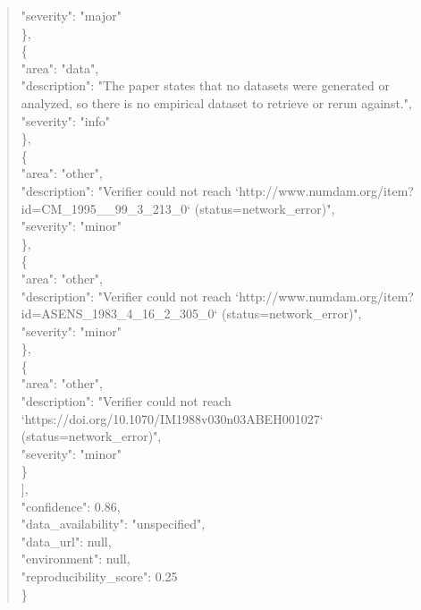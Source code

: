 \documentclass[11pt]{article}
\begin{document}
\begin{quote}
      "severity": "major"\\
    \},\\
    \{\\
      "area": "data",\\
      "description": "The paper states that no datasets were generated or analyzed, so there is no empirical dataset to retrieve or rerun against.",\\
      "severity": "info"\\
    \},\\
    \{\\
      "area": "other",\\
      "description": "Verifier could not reach `http://www.numdam.org/item?id=CM\_1995\_\_99\_3\_213\_0` (status=network\_error)",\\
      "severity": "minor"\\
    \},\\
    \{\\
      "area": "other",\\
      "description": "Verifier could not reach `http://www.numdam.org/item?id=ASENS\_1983\_4\_16\_2\_305\_0` (status=network\_error)",\\
      "severity": "minor"\\
    \},\\
    \{\\
      "area": "other",\\
      "description": "Verifier could not reach `https://doi.org/10.1070/IM1988v030n03ABEH001027` (status=network\_error)",\\
      "severity": "minor"\\
    \}\\
  ],\\
  "confidence": 0.86,\\
  "data\_availability": "unspecified",\\
  "data\_url": null,\\
  "environment": null,\\
  "reproducibility\_score": 0.25\\
\}\\
\end{quote}
\end{document}
